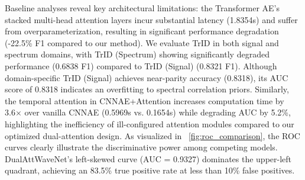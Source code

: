 \documentclass[conference]{IEEEtran}
\begin{document}
\begin{table}[htbp]
    \caption{Performance Comparison of DualAttWaveNet Against Baseline Models}
    \label{tab:main_results}
    \centering
\end{table}



Baseline analyses reveal key architectural limitations: the Transformer AE's stacked multi-head attention layers incur substantial latency (1.8354s) and suffer from overparameterization, resulting in significant performance degradation (-22.5\% F1 compared to our method). We evaluate TrID in both signal and spectrum domains, with TrID (Spectrum) showing significantly degraded performance (0.6838 F1) compared to TrID (Signal) (0.8321 F1). Although domain-specific TrID (Signal) achieves near-parity accuracy (0.8318), its AUC score of 0.8318 indicates an overfitting to spectral correlation priors. Similarly, the temporal attention in CNNAE+Attention increases computation time by 3.6× over vanilla CNNAE (0.5969s vs. 0.1654s) while degrading AUC by 5.2\%, highlighting the inefficiency of ill-configured attention modules compared to our optimized dual-attention design. As visualized in \figurename~\ref{fig:roc_comparison}, the ROC curves clearly illustrate the discriminative power among competing models. DualAttWaveNet's left-skewed curve (AUC = 0.9327) dominates the upper-left quadrant, achieving an 83.5\% true positive rate at less than 10\% false positives. 
\end{document}
